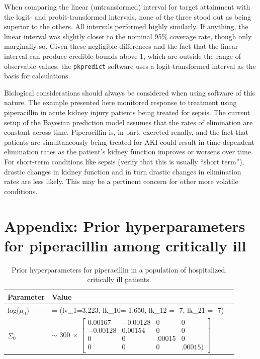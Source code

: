 \documentclass{article}\usepackage[]{graphicx}\usepackage[]{color}
\begin{document}
When comparing the linear (untransformed) interval for target attainment with the logit- and probit-transformed intervals, none of the three stood out as being superior to the others. All intervals performed highly similarly. If anything, the linear interval was slightly closer to the nominal 95\% coverage rate, though only marginally so. Given these negligible differences and the fact that the linear interval can produce credible bounds above 1, which are outside the range of observable values, the \texttt{pkpredict} software uses a logit-transformed interval as the basis for calculations.

Biological considerations should always be considered when using software of this nature. The example presented here monitored response to treatment using piperacillin in acute kidney injury patients being treated for sepsis. The current setup of the Bayesian prediction model assumes that the rates of elimination are constant across time. Piperacillin is, in part, excreted renally, and the fact that patients are simultaneously being treated for AKI could result in time-dependent elimination rates as the patient's kidney function improves or worsens over time. For short-term conditions like sepsis (verify that this is usually ``short term''), drastic changes in kidney function and in turn drastic changes in elimination rates are less likely. This may be a pertinent concern for other more volatile conditions.


\section{Appendix: Prior hyperparameters for piperacillin among critically ill}
\begin{center}
\begin{table}
\begin{tabular}{lll} \hline
Parameter & Value \\ \hline
log($\mu_0$) & = (lv_1=3.223, lk_10=-1.650, lk_12 = -7, lk_21 = -7)\\
$\Sigma_0$ & $\sim$ 300 $\times$ $\begin{bmatrix} 0.00167 & -0.00128 & 0 & 0\\
                                -0.00128 & 0.00154 &      0 &      0 \\
                                       0 &       0 & .00015 &      0 \\
                                       0 &       0 &      0 & .00015)\end{bmatrix}$ \\ %
\hline
\end{tabular}
\caption{Prior hyperparameters for piperacillin in a population of hospitalized, critically ill patients.}\label{tab:hyp}
\end{table}
\end{center}
\end{document}

